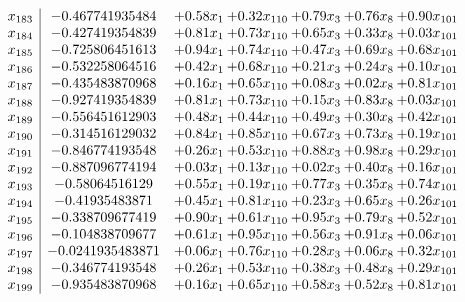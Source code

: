 \documentclass[8pt]{article}
\begin{document}
\[\begin{array}{c| c c@{\hskip 2pt} c@{\hskip 2pt} c@{\hskip 2pt} c@{\hskip 2pt} c@{\hskip 2pt} }
 x_{183}   &  -0.467741935484 & +  0.58 x_{1} & +  0.32 x_{110} & +  0.79 x_{3} & +  0.76 x_{8} & +  0.90 x_{101}\\
 x_{184}   &  -0.427419354839 & +  0.81 x_{1} & +  0.73 x_{110} & +  0.65 x_{3} & +  0.33 x_{8} & +  0.03 x_{101}\\
 x_{185}   &  -0.725806451613 & +  0.94 x_{1} & +  0.74 x_{110} & +  0.47 x_{3} & +  0.69 x_{8} & +  0.68 x_{101}\\
 x_{186}   &  -0.532258064516 & +  0.42 x_{1} & +  0.68 x_{110} & +  0.21 x_{3} & +  0.24 x_{8} & +  0.10 x_{101}\\
 x_{187}   &  -0.435483870968 & +  0.16 x_{1} & +  0.65 x_{110} & +  0.08 x_{3} & +  0.02 x_{8} & +  0.81 x_{101}\\
 x_{188}   &  -0.927419354839 & +  0.81 x_{1} & +  0.73 x_{110} & +  0.15 x_{3} & +  0.83 x_{8} & +  0.03 x_{101}\\
 x_{189}   &  -0.556451612903 & +  0.48 x_{1} & +  0.44 x_{110} & +  0.49 x_{3} & +  0.30 x_{8} & +  0.42 x_{101}\\
 x_{190}   &  -0.314516129032 & +  0.84 x_{1} & +  0.85 x_{110} & +  0.67 x_{3} & +  0.73 x_{8} & +  0.19 x_{101}\\
 x_{191}   &  -0.846774193548 & +  0.26 x_{1} & +  0.53 x_{110} & +  0.88 x_{3} & +  0.98 x_{8} & +  0.29 x_{101}\\
 x_{192}   &  -0.887096774194 & +  0.03 x_{1} & +  0.13 x_{110} & +  0.02 x_{3} & +  0.40 x_{8} & +  0.16 x_{101}\\
 x_{193}   &  -0.58064516129 & +  0.55 x_{1} & +  0.19 x_{110} & +  0.77 x_{3} & +  0.35 x_{8} & +  0.74 x_{101}\\
 x_{194}   &  -0.41935483871 & +  0.45 x_{1} & +  0.81 x_{110} & +  0.23 x_{3} & +  0.65 x_{8} & +  0.26 x_{101}\\
 x_{195}   &  -0.338709677419 & +  0.90 x_{1} & +  0.61 x_{110} & +  0.95 x_{3} & +  0.79 x_{8} & +  0.52 x_{101}\\
 x_{196}   &  -0.104838709677 & +  0.61 x_{1} & +  0.95 x_{110} & +  0.56 x_{3} & +  0.91 x_{8} & +  0.06 x_{101}\\
 x_{197}   &  -0.0241935483871 & +  0.06 x_{1} & +  0.76 x_{110} & +  0.28 x_{3} & +  0.06 x_{8} & +  0.32 x_{101}\\
 x_{198}   &  -0.346774193548 & +  0.26 x_{1} & +  0.53 x_{110} & +  0.38 x_{3} & +  0.48 x_{8} & +  0.29 x_{101}\\
 x_{199}   &  -0.935483870968 & +  0.16 x_{1} & +  0.65 x_{110} & +  0.58 x_{3} & +  0.52 x_{8} & +  0.81 x_{101}\\

\end{array}\]
\end{document}
